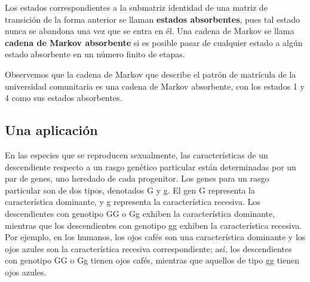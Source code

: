 \documentclass[12pt,a4paper]{book}
\begin{document}
    \begin{definicion}
        Los estados correspondientes a la submatriz identidad de una matriz de transición de la forma anterior se llaman \textbf{estados absorbentes}, pues tal estado nunca se abandona una vez que se entra en él. Una cadena de Markov se llama \textbf{cadena de Markov absorbente} si es posible pasar de cualquier estado a algún estado absorbente en un número finito de etapas.
    \end{definicion}

    Observemos que la cadena de Markov que describe el patrón de matrícula de la universidad comunitaria es una cadena de Markov absorbente, con los estados 1 y 4 como sus estados absorbentes.

    \subsection*{Una aplicación}

    En las especies que se reproducen sexualmente, las características de un descendiente respecto a un rasgo genético particular están determinadas por un par de genes, uno heredado de cada progenitor. Los genes para un rasgo particular son de dos tipos, denotados G y g. El gen G representa la característica dominante, y g representa la característica recesiva. Los descendientes con genotipo GG o Gg exhiben la característica dominante, mientras que los descendientes con genotipo gg exhiben la característica recesiva. Por ejemplo, en los humanos, los ojos cafés son una característica dominante y los ojos azules son la característica recesiva correspondiente; así, los descendientes con genotipo GG o Gg tienen ojos cafés, mientras que aquellos de tipo gg tienen ojos azules.
\end{document}
